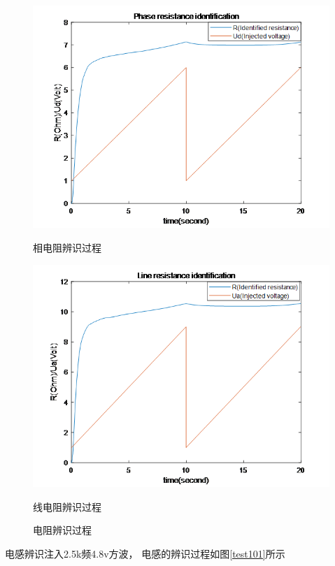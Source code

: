 ﻿\documentclass[12pt,a4paper]{article}
\begin{document}
\begin{figure}[!htbp]
  \centering
  \begin{minipage}{0.49\linewidth}
    \centering
    \includegraphics[width=\linewidth]{picture/参数辨识1.png}
    \caption{相电阻辨识过程}
  \end{minipage}
  \begin{minipage}{0.49\linewidth}
    \centering
    \includegraphics[width=\linewidth]{picture/参数辨识2.png}
    \caption{线电阻辨识过程}
  \end{minipage} 	%
  \caption{电阻辨识过程}
  \label{test100}%
\end{figure}
电感辨识注入2.5k频4.8v方波，
电感的辨识过程如图\ref{test101}所示
\end{document}
